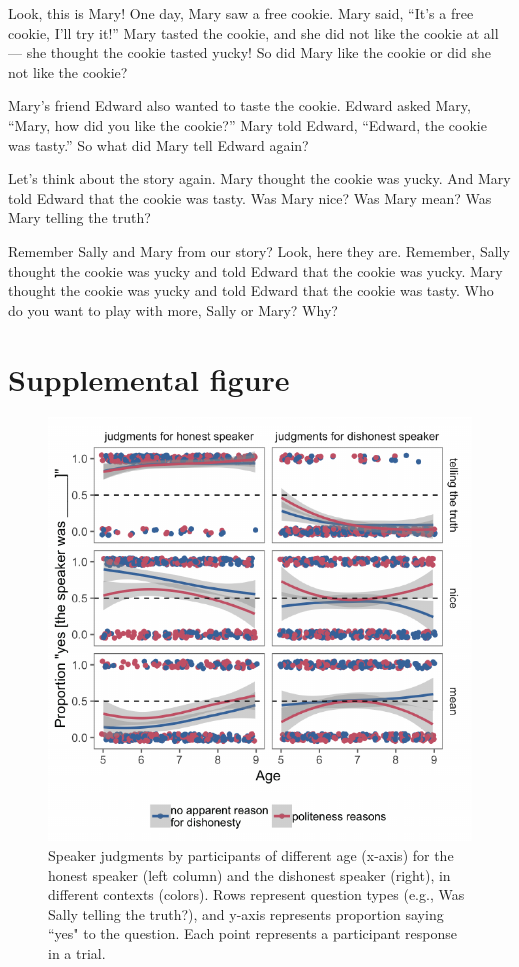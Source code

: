 \documentclass[oneside]{report}
\begin{document}
Look, this is Mary! One day, Mary saw a free cookie. Mary said, ``It's a
free cookie, I'll try it!'' Mary tasted the cookie, and she did not like
the cookie at all --- she thought the cookie tasted yucky! So did Mary
like the cookie or did she not like the cookie?

Mary's friend Edward also wanted to taste the cookie. Edward asked Mary,
``Mary, how did you like the cookie?'' Mary told Edward, ``Edward, the
cookie was tasty.'' So what did Mary tell Edward again?

Let's think about the story again. Mary thought the cookie was yucky.
And Mary told Edward that the cookie was tasty. Was Mary nice? Was Mary
mean? Was Mary telling the truth?

Remember Sally and Mary from our story? Look, here they are. Remember,
Sally thought the cookie was yucky and told Edward that the cookie was
yucky. Mary thought the cookie was yucky and told Edward that the cookie
was tasty. Who do you want to play with more, Sally or Mary? Why?

\section{Supplemental figure}\label{supplemental-figure}
\begin{figure}[p]

{\centering \includegraphics[width=0.9\linewidth]{erica_yoon_dissertation_files/figure-latex/figTrupolAppendix-1} 

}

\caption[Speaker ratings for the experiment in Chapter 4 with age as a continuous variable.]{Speaker judgments by participants of different age (x-axis) for the honest speaker (left column) and the dishonest speaker (right), in different contexts (colors). Rows represent question types (e.g., Was Sally telling the truth?), and y-axis represents proportion saying ``yes" to the question. Each point represents a participant response in a trial.}\label{fig:figTrupolAppendix}
\end{figure}
\end{document}
